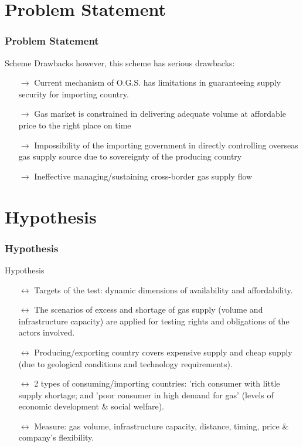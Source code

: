 \documentclass[pdflatex,compress,10pt,
	xcolor={dvipsnames,dvipsnames,svgnames,x11names,table},
	hyperref={
	colorlinks = true,
	breaklinks = true, 
	citecolor=NavyBlue, 
	urlcolor = blue, 
	filecolor=magenta} 
]{beamer}
\begin{document}
\section{Problem Statement}
\begin{frame}\frametitle{Problem Statement}

\begin{alertblock}{Scheme Drawbacks}
however, this scheme has serious drawbacks:
\begin{itemize}
	\item [$\rightarrow$] Current mechanism of O.G.S. has limitations in guaranteeing supply security for importing country.
	\item [$\rightarrow$] Gas market is constrained in delivering adequate volume at affordable price to the right place on time
	\item [$\rightarrow$] Impossibility of the importing government in directly controlling overseas gas supply source due to sovereignty of the producing country
	\item [$\rightarrow$] Ineffective managing/sustaining cross-border gas supply flow
\end{itemize}
\end{alertblock}
\end{frame}

\section{Hypothesis}
\begin{frame}\frametitle{Hypothesis}

\begin{alertblock}{Hypothesis}
\begin{itemize}
	\item [$\longleftrightarrow$] Targets of the test: dynamic dimensions of availability and affordability.
	\item [$\longleftrightarrow$] The scenarios of excess and shortage of gas supply (volume and infrastructure capacity) are applied for testing rights and obligations of the actors involved.
	\item [$\longleftrightarrow$] Producing/exporting country covers expensive supply and cheap supply (due to geological conditions and technology requirements).
	\item [$\longleftrightarrow$] 2 types of consuming/importing countries: 'rich consumer with little supply shortage; and 'poor consumer in high demand for gas' (levels of economic development \& social welfare).
	\item [$\longleftrightarrow$] Measure: gas volume, infrastructure capacity, distance, timing, price \& company’s flexibility.
\end{itemize}
\end{alertblock}

\end{frame}
\end{document}
